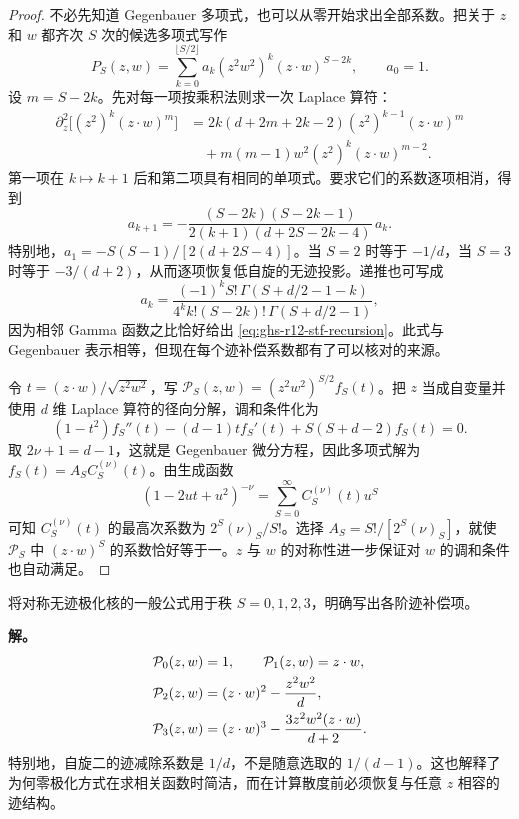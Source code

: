 \begin{proof}
不必先知道 Gegenbauer 多项式，也可以从零开始求出全部系数。把关于 $z$ 和 $w$ 都齐次 $S$ 次的候选多项式写作
\[
 P_S(z,w)=\sum_{k=0}^{\lfloor S/2\rfloor}
 a_k(z^2w^2)^k(z\cdot w)^{S-2k},\qquad a_0=1.
\]
设 $m=S-2k$。先对每一项按乘积法则求一次 Laplace 算符：
\begin{align*}
 \partial_z^2\bigl[(z^2)^k(z\cdot w)^m\bigr]
 &=2k(d+2m+2k-2)(z^2)^{k-1}(z\cdot w)^m\\
 &\quad +m(m-1)w^2(z^2)^k(z\cdot w)^{m-2}.
\end{align*}
第一项在 $k\mapsto k+1$ 后和第二项具有相同的单项式。要求它们的系数逐项相消，得到
\begin{equation}\label{eq:ghs-r12-stf-recursion}
 a_{k+1}=-\frac{(S-2k)(S-2k-1)}{2(k+1)(d+2S-2k-4)}\,a_k.
\end{equation}
特别地，$a_1=-S(S-1)/[2(d+2S-4)]$。当 $S=2$ 时等于 $-1/d$，当 $S=3$ 时等于 $-3/(d+2)$，从而逐项恢复低自旋的无迹投影。递推也可写成
\[
 a_k=\frac{(-1)^k S!\,\Gamma(S+d/2-1-k)}
 {4^k k!(S-2k)!\,\Gamma(S+d/2-1)},
\]
因为相邻 Gamma 函数之比恰好给出 \cref{eq:ghs-r12-stf-recursion}。此式与 Gegenbauer 表示相等，但现在每个迹补偿系数都有了可以核对的来源。


令 $t=(z\cdot w)/\sqrt{z^2w^2}$，写 $\mathcal P_S(z,w)=(z^2w^2)^{S/2}f_S(t)$。把 $z$ 当成自变量并使用 $d$ 维 Laplace 算符的径向分解，调和条件化为
\begin{equation*}
 (1-t^2)f_S''(t)-(d-1)t f_S'(t)+S(S+d-2)f_S(t)=0.
\end{equation*}
取 $2\nu+1=d-1$，这就是 Gegenbauer 微分方程，因此多项式解为 $f_S(t)=A_SC_S^{(\nu)}(t)$。由生成函数
\begin{equation*}
 (1-2ut+u^2)^{-\nu}=\sum_{S=0}^\infty C_S^{(\nu)}(t)u^S
\end{equation*}
可知 $C_S^{(\nu)}(t)$ 的最高次系数为 $2^S(\nu)_S/S!$。选择 $A_S=S!/[2^S(\nu)_S]$，就使 $\mathcal P_S$ 中 $(z\cdot w)^S$ 的系数恰好等于一。$z$ 与 $w$ 的对称性进一步保证对 $w$ 的调和条件也自动满足。
\end{proof}

\begin{example}[秩零至秩三的迹补偿]
将对称无迹极化核的一般公式用于秩 $S=0,1,2,3$，明确写出各阶迹补偿项。

\textbf{解。} \begin{align}\label{eq:ghs-r4-stf-lowspin}
 \mathcal P_0(z,w)&=1,\qquad \mathcal P_1(z,w)=z\cdot w,\\
 \mathcal P_2(z,w)&=(z\cdot w)^2-\frac{z^2w^2}{d},\notag\\
 \mathcal P_3(z,w)&=(z\cdot w)^3-\frac{3z^2w^2(z\cdot w)}{d+2}.\notag
\end{align}
特别地，自旋二的迹减除系数是 $1/d$，不是随意选取的 $1/(d-1)$。这也解释了为何零极化方式在求相关函数时简洁，而在计算散度前必须恢复与任意 $z$ 相容的迹结构。
\end{example}

